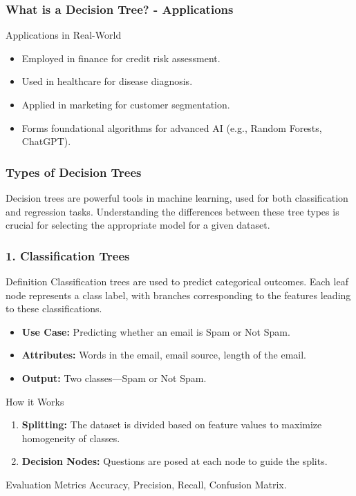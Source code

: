 \documentclass[aspectratio=169]{beamer}
\begin{document}
\begin{frame}[fragile]
    \frametitle{What is a Decision Tree? - Applications}
    \begin{block}{Applications in Real-World}
        \begin{itemize}
            \item Employed in finance for credit risk assessment.
            \item Used in healthcare for disease diagnosis.
            \item Applied in marketing for customer segmentation.
            \item Forms foundational algorithms for advanced AI (e.g., Random Forests, ChatGPT).
        \end{itemize}
    \end{block}
\end{frame}

\begin{frame}[fragile]
    \frametitle{Types of Decision Trees}
    Decision trees are powerful tools in machine learning, used for both classification and regression tasks. Understanding the differences between these tree types is crucial for selecting the appropriate model for a given dataset.
\end{frame}

\begin{frame}[fragile]
    \frametitle{1. Classification Trees}
    
    \begin{block}{Definition}
        Classification trees are used to predict categorical outcomes. Each leaf node represents a class label, with branches corresponding to the features leading to these classifications.
    \end{block}
    
    \begin{itemize}
        \item \textbf{Use Case:} Predicting whether an email is Spam or Not Spam.
        \item \textbf{Attributes:} Words in the email, email source, length of the email.
        \item \textbf{Output:} Two classes—Spam or Not Spam.
    \end{itemize}
    
    \begin{block}{How it Works}
        \begin{enumerate}
            \item \textbf{Splitting:} The dataset is divided based on feature values to maximize homogeneity of classes.
            \item \textbf{Decision Nodes:} Questions are posed at each node to guide the splits.
        \end{enumerate}
    \end{block}

    \begin{block}{Evaluation Metrics}
        Accuracy, Precision, Recall, Confusion Matrix.
    \end{block}
\end{frame}
\end{document}
